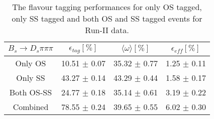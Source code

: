 \begin{table}[h]
\centering
\caption{The flavour tagging performances for only OS tagged, only SS tagged and both OS and SS tagged events for Run-II data.}
\begin{tabular}{c c c c}
\hline
\hline
$ B_s \to D_s \pi \pi \pi$ & $\epsilon_{tag} [\%]$ & $\langle \omega \rangle [\%] $ & $\epsilon_{eff} [\%]$ \\
\hline
Only OS & 10.51 $\pm$ 0.07 & 35.32 $\pm$ 0.77 & 1.25 $\pm$ 0.11\\
Only SS & 43.27 $\pm$ 0.14 & 43.29 $\pm$ 0.44 & 1.58 $\pm$ 0.17\\
Both OS-SS & 24.77 $\pm$ 0.18 & 35.14 $\pm$ 0.61 & 3.19 $\pm$ 0.22\\
\hline
Combined & 78.55 $\pm$ 0.24 & 39.65 $\pm$ 0.55 & 6.02 $\pm$ 0.30\\
\hline
\hline
\end{tabular}
\label{table:tagging_Run2}
\end{table}